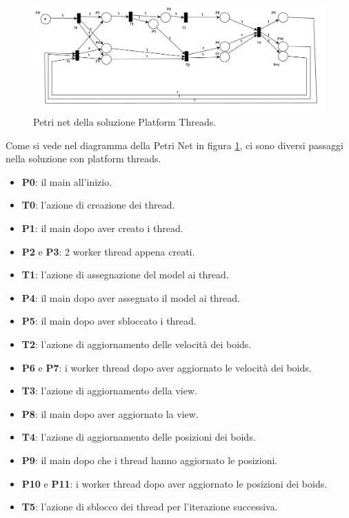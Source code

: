 \documentclass[11pt,notitlepage]{article}
\begin{document}
\begin{figure}[H]
    \centering
    \includegraphics[width=\textwidth]{Petri net 1.png}
    \caption{Petri net della soluzione Platform Threads.}
    \label{fig:platform-threads-diagram}
\end{figure}
Come si vede nel diagramma della Petri Net in figura \ref{fig:platform-threads-diagram}, ci sono diversi passaggi nella soluzione con platform threads.
\begin{itemize}
    \item \textbf{P0}: il main all'inizio.
    \item \textbf{T0}: l'azione di creazione dei thread.
    \item \textbf{P1}: il main dopo aver creato i thread.
    \item \textbf{P2} e \textbf{P3}: 2 worker thread appena creati.
    \item \textbf{T1}: l'azione di assegnazione del model ai thread.
    \item \textbf{P4}: il main dopo aver assegnato il model ai thread.
    \item \textbf{P5}: il main dopo aver sbloccato i thread.
    \item \textbf{T2}: l'azione di aggiornamento delle velocità dei boids.
    \item \textbf{P6} e \textbf{P7}: i worker thread dopo aver aggiornato le velocità dei boids.
    \item \textbf{T3}: l'azione di aggiornamento della view.
    \item \textbf{P8}: il main dopo aver aggiornato la view.
    \item \textbf{T4}: l'azione di aggiornamento delle posizioni dei boids.
    \item \textbf{P9}: il main dopo che i thread hanno aggiornato le posizioni.
    \item \textbf{P10} e \textbf{P11}: i worker thread dopo aver aggiornato le posizioni dei boids.
    \item \textbf{T5}: l'azione di sblocco dei thread per l'iterazione successiva.
\end{itemize}
\newpage
\end{document}
